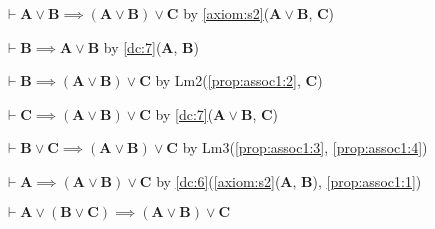 \documentclass{amsart}%
\newcommand\metavariable[1]{\boldsymbol{#1}}
\begin{document}
\begin{pf}
\item\label{prop:assoc1:1} $\vdash\metavariable{A}\lor\metavariable{B}\implies(\metavariable{A}\lor\metavariable{B})\lor\metavariable{C}$
  by \ref{axiom:s2}($\metavariable{A}\lor\metavariable{B}$, $\metavariable{C}$)
\item\label{prop:assoc1:2} $\vdash\metavariable{B}\implies\metavariable{A}\lor\metavariable{B}$
  by \ref{dc:7}($\metavariable{A}$, $\metavariable{B}$)
\item\label{prop:assoc1:3} $\vdash\metavariable{B}\implies(\metavariable{A}\lor\metavariable{B})\lor\metavariable{C}$
  by Lm2(\ref{prop:assoc1:2}, $\metavariable{C}$)
\item\label{prop:assoc1:4} $\vdash\metavariable{C}\implies(\metavariable{A}\lor\metavariable{B})\lor\metavariable{C}$
  by \ref{dc:7}($\metavariable{A}\lor\metavariable{B}$, $\metavariable{C}$)
\item\label{prop:assoc1:5} $\vdash\metavariable{B}\lor\metavariable{C}\implies(\metavariable{A}\lor\metavariable{B})\lor\metavariable{C}$
  by Lm3(\ref{prop:assoc1:3}, \ref{prop:assoc1:4})
\item\label{prop:assoc1:6} $\vdash\metavariable{A}\implies(\metavariable{A}\lor\metavariable{B})\lor\metavariable{C}$
  by \ref{dc:6}(\ref{axiom:s2}($\metavariable{A}$, $\metavariable{B}$), \ref{prop:assoc1:1})
\item\label{prop:assoc1:7} $\vdash\metavariable{A}\lor(\metavariable{B}\lor\metavariable{C})\implies(\metavariable{A}\lor\metavariable{B})\lor\metavariable{C}$
\end{pf}
\end{document}
